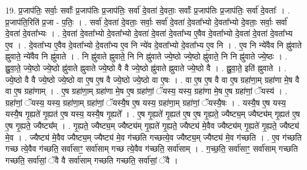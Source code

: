 \documentclass[17pt]{extarticle}
\begin{document}
19. प्र॒जाप॑तिः॒ सर्वाः॒ सर्वाः᳚ प्र॒जाप॑तिः प्र॒जाप॑तिः॒ सर्वा॑ दे॒वता॑ दे॒वताः॒ सर्वाः᳚ प्र॒जाप॑तिः प्र॒जाप॑तिः॒ सर्वा॑ दे॒वताः᳚ । . प्र॒जाप॑ति॒रिति॑ प्र॒जा - प॒तिः॒ । . सर्वा॑ दे॒वता॑ दे॒वताः॒ सर्वाः॒ सर्वा॑ दे॒वता॑ दे॒वता᳚भ्यो दे॒वता᳚भ्यो दे॒वताः॒ सर्वाः॒ सर्वा॑ दे॒वता॑ दे॒वता᳚भ्यः । . दे॒वता॑ दे॒वता᳚भ्यो दे॒वता᳚भ्यो दे॒वता॑ दे॒वता॑ दे॒वता᳚भ्य ए॒वैव दे॒वता᳚भ्यो दे॒वता॑ दे॒वता॑ दे॒वता᳚भ्य ए॒व । . दे॒वता᳚भ्य ए॒वैव दे॒वता᳚भ्यो दे॒वता᳚भ्य ए॒व नि न्ये॑व दे॒वता᳚भ्यो दे॒वता᳚भ्य ए॒व नि । . ए॒व नि न्ये॑वैव नि ह्नु॑वाते ह्नुवाते॒ न्ये॑वैव नि ह्नु॑वाते । . नि ह्नु॑वाते ह्नुवाते॒ नि नि ह्नु॑वाते ज्ये॒ष्ठो ज्ये॒ष्ठो ह्नु॑वाते॒ नि नि ह्नु॑वाते ज्ये॒ष्ठः । . ह्नु॒वा॒ते॒ ज्ये॒ष्ठो ज्ये॒ष्ठो ह्नु॑वाते ह्नुवाते ज्ये॒ष्ठो वै वै ज्ये॒ष्ठो ह्नु॑वाते ह्नुवाते ज्ये॒ष्ठो वै । . ह्नु॒वा॒ते॒ इति॑ ह्नुवाते । . ज्ये॒ष्ठो वै वै ज्ये॒ष्ठो ज्ये॒ष्ठो वा ए॒ष ए॒ष वै ज्ये॒ष्ठो ज्ये॒ष्ठो वा ए॒षः । . वा ए॒ष ए॒ष वै वा ए॒ष ग्रहा॑णा॒म् ग्रहा॑णा मे॒ष वै वा ए॒ष ग्रहा॑णाम् । . ए॒ष ग्रहा॑णा॒म् ग्रहा॑णा मे॒ष ए॒ष ग्रहा॑णां॒ ॅयस्य॒ यस्य॒ ग्रहा॑णा मे॒ष ए॒ष ग्रहा॑णां॒ ॅयस्य॑ । . ग्रहा॑णां॒ ॅयस्य॒ यस्य॒ ग्रहा॑णा॒म् ग्रहा॑णां॒ ॅयस्यै॒ष ए॒ष यस्य॒ ग्रहा॑णा॒म् ग्रहा॑णां॒ ॅयस्यै॒षः । . यस्यै॒ष ए॒ष यस्य॒ यस्यै॒ष गृ॒ह्यते॑ गृ॒ह्यत॑ ए॒ष यस्य॒ यस्यै॒ष गृ॒ह्यते᳚ । . ए॒ष गृ॒ह्यते॑ गृ॒ह्यत॑ ए॒ष ए॒ष गृ॒ह्यते॒ ज्यैष्ट्य॒म् ज्यैष्ट्य॑म् गृ॒ह्यत॑ ए॒ष ए॒ष गृ॒ह्यते॒ ज्यैष्ट्य᳚म् । . गृ॒ह्यते॒ ज्यैष्ट्य॒म् ज्यैष्ट्य॑म् गृ॒ह्यते॑ गृ॒ह्यते॒ ज्यैष्ट्य॑ मे॒वैव ज्यैष्ट्य॑म् गृ॒ह्यते॑ गृ॒ह्यते॒ ज्यैष्ट्य॑ मे॒व । . ज्यैष्ट्य॑ मे॒वैव ज्यैष्ट्य॒म् ज्यैष्ट्य॑ मे॒व ग॑च्छति गच्छत्ये॒व ज्यैष्ट्य॒म् ज्यैष्ट्य॑ मे॒व ग॑च्छति । . ए॒व ग॑च्छति गच्छ त्ये॒वैव ग॑च्छति॒ सर्वा॑साꣳ॒॒ सर्वा॑साम् गच्छ त्ये॒वैव ग॑च्छति॒ सर्वा॑साम् । . ग॒च्छ॒ति॒ सर्वा॑साꣳ॒॒ सर्वा॑साम् गच्छति गच्छति॒ सर्वा॑सां॒ ॅवै वै सर्वा॑साम् गच्छति गच्छति॒ सर्वा॑सां॒ ॅवै । \newline
\end{document}
